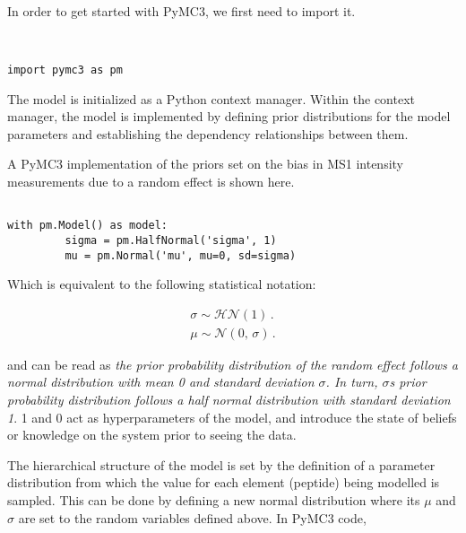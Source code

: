 In order to get started with PyMC3, we first need to import it.

\begin{verbatim}


import pymc3 as pm              
\end{verbatim}

The model is initialized as a Python context manager. Within the context manager, the model is implemented by defining prior distributions for the model parameters and establishing the dependency relationships between them.

A PyMC3 implementation of the priors set on the bias in \ac{MS1} intensity measurements due to a random effect is shown here.

\begin{verbatim}

with pm.Model() as model:             
         sigma = pm.HalfNormal('sigma', 1)
         mu = pm.Normal('mu', mu=0, sd=sigma)
\end{verbatim}


Which is equivalent to the following statistical notation:

\begin{align}
\sigma \sim \mathcal{HN}(1)\,.  \\
\mu \sim \mathcal{N}(0,\,\sigma)\,.
\end{align}

and can be read as \textit{the prior probability distribution of the random effect follows a normal distribution with mean 0 and standard deviation $\sigma$. In turn, $\sigma$\textquotesingle s prior probability distribution follows a half normal distribution with standard deviation 1}. 1 and 0 act as hyperparameters of the model, and introduce the state of beliefs or knowledge on the system prior to seeing the data.


The hierarchical structure of the model is set by the definition of a parameter distribution from which the value for each element (peptide) being modelled is sampled. This can be done by defining a new normal distribution where its $\mu$ and $\sigma$ are set to the random variables defined above. In PyMC3 code,

